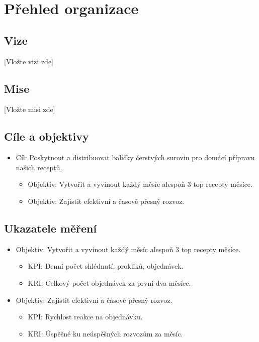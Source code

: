 \documentclass[11pt,a4paper]{article}
\begin{document}
\setlength{\parskip}{0pt}
    \hypersetup{hidelinks}\tableofcontents
\setlength{\parskip}{0pt}

\newpage

\section{Přehled organizace}

\subsection{Vize}

[Vložte vizi zde]

\subsection{Mise}

[Vložte misi zde]

\subsection{Cíle a objektivy}
\begin{itemize}
    \item Cíl: Poskytnout a distribuovat balíčky čerstvých surovin pro domácí přípravu našich receptů.
    \begin{itemize}
        \item Objektiv: Vytvořit a vyvinout každý měsíc alespoň 3 top recepty měsíce.
        \item Objektiv: Zajistit efektivní a časově přesný rozvoz.
    \end{itemize}
\end{itemize}

\subsection{Ukazatele měření}

\begin{itemize}
    \item Objektiv: Vytvořit a vyvinout každý měsíc alespoň 3 top recepty měsíce.
    \begin{itemize}
        \item KPI: Denní počet shlédnutí, prokliků, objednávek.
        \item KRI: Celkový počet objednávek za první dva měsíce.
    \end{itemize}
    \item Objektiv: Zajistit efektivní a časově přesný rozvoz.
    \begin{itemize}
        \item KPI: Rychlost reakce na objednávku.
        \item KRI: Úspěšné ku neúspěšných rozvozům za měsíc.
    \end{itemize}
\end{itemize}
\end{document}
